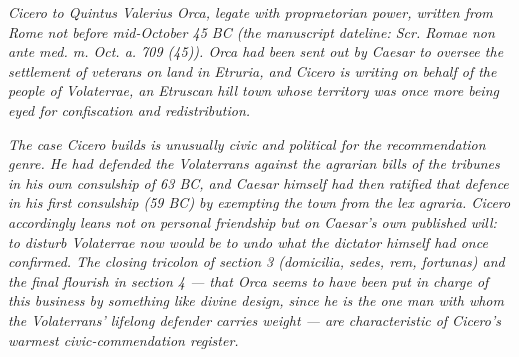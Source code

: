 
\textit{Cicero to Quintus Valerius Orca, legate with
propraetorian power, written from Rome not before
mid-October 45 BC (the manuscript dateline: \textit{Scr.
Romae non ante med. m. Oct. a. 709 (45)}). Orca had been
sent out by Caesar to oversee the settlement of veterans
on land in Etruria, and Cicero is writing on behalf of
the people of Volaterrae, an Etruscan hill town whose
territory was once more being eyed for confiscation and
redistribution.}

\textit{The case Cicero builds is unusually civic and
political for the recommendation genre. He had defended
the Volaterrans against the agrarian bills of the
tribunes in his own consulship of 63 BC, and Caesar
himself had then ratified that defence in his first
consulship (59 BC) by exempting the town from the
\textit{lex agraria}. Cicero accordingly leans not on
personal friendship but on Caesar's own published will:
to disturb Volaterrae now would be to undo what the
dictator himself had once confirmed. The closing tricolon
of section 3 (\textit{domicilia, sedes, rem, fortunas})
and the final flourish in section 4 --- that Orca seems
to have been put in charge of this business by something
like divine design, since he is the one man with whom
the Volaterrans' lifelong defender carries weight --- are
characteristic of Cicero's warmest civic-commendation
register.}
